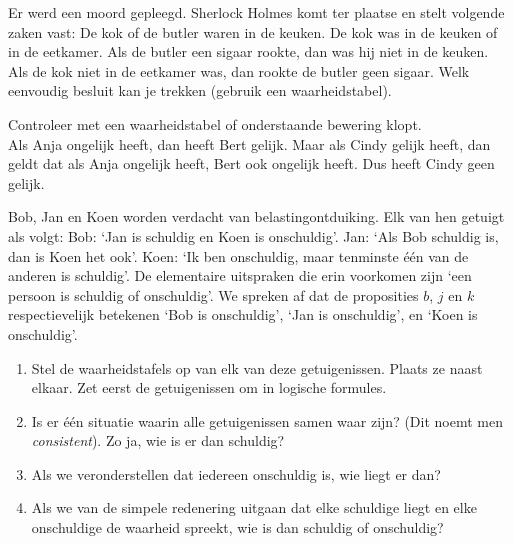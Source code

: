 \begin{oef}
 Er werd een moord gepleegd. Sherlock Holmes komt ter plaatse en stelt volgende zaken vast:
De kok of de butler waren in de keuken.
De kok was in de keuken of in de eetkamer.
Als de butler een sigaar rookte, dan was hij niet in de keuken.
Als de kok niet in de eetkamer was, dan rookte de butler geen sigaar.
Welk eenvoudig besluit kan je trekken (gebruik een waarheidstabel).
\end{oef}

\begin{oef}
 Controleer met een waarheidstabel of onderstaande bewering klopt.\\
Als Anja ongelijk heeft, dan heeft Bert gelijk. Maar als Cindy gelijk
heeft, dan geldt dat als Anja ongelijk heeft, Bert ook ongelijk
heeft. Dus heeft Cindy geen gelijk.
\end{oef}

\begin{oef}
 Bob, Jan en Koen worden verdacht van belastingontduiking. Elk van hen getuigt als volgt:
Bob: `Jan is schuldig en Koen is onschuldig'.
Jan: `Als Bob schuldig is, dan is Koen het ook'.
Koen: `Ik ben onschuldig, maar tenminste \'{e}\'{e}n van de anderen is schuldig'.
De elementaire uitspraken die erin voorkomen zijn `een persoon is schuldig of onschuldig'. We spreken af dat de proposities $b$, $j$ en $k$ respectievelijk betekenen `Bob is onschuldig', `Jan is onschuldig', en `Koen is onschuldig'.
\begin{enumerate}
\item Stel de waarheidstafels op van elk van deze getuigenissen. Plaats ze naast elkaar. Zet eerst de getuigenissen om in logische formules.
\item Is er \'{e}\'{e}n situatie waarin alle getuigenissen samen waar zijn? (Dit noemt men \emph{consistent}). Zo ja, wie is er dan schuldig?
\item Als we veronderstellen dat iedereen onschuldig is, wie liegt er dan?
\item Als we van de simpele redenering uitgaan dat elke schuldige liegt en elke onschuldige de waarheid spreekt, wie is dan schuldig of onschuldig?
\end{enumerate}

\end{oef}

